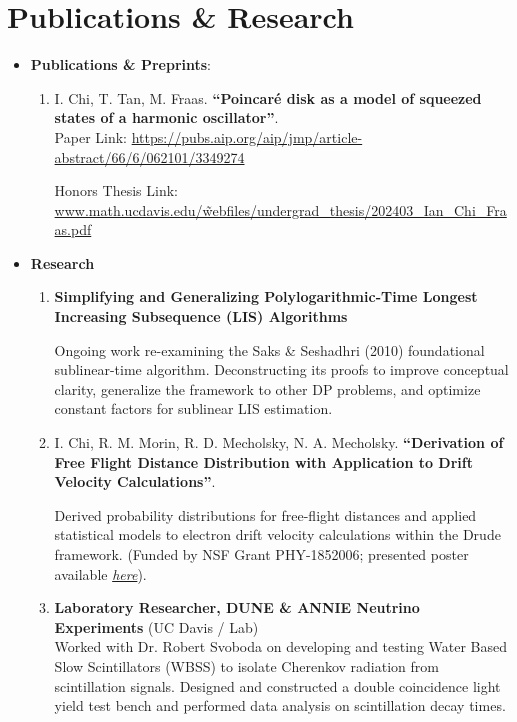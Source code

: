 \documentclass{curriculum-vitae}
\begin{document}
\section{Publications \& Research}
\begin{itemize}
    \item\textbf{Publications \& Preprints}:
    \begin{enumerate}
        \item\label{pub: pub1} I. Chi, T. Tan, M. Fraas. \textbf{``Poincar\'e disk as a model of squeezed states of a harmonic oscillator''}. \\
        Paper Link: \hyperlink{https://pubs.aip.org/aip/jmp/article-abstract/66/6/062101/3349274}{https://pubs.aip.org/aip/jmp/article-abstract/66/6/062101/3349274}

        Honors Thesis Link: \hyperlink{https://tinyurl.com/2pj46txh}{www.math.ucdavis.edu/\~webfiles/undergrad\_thesis/202403\_Ian\_Chi\_Fraas.pdf}

       

    \end{enumerate}
    \item \textbf{Research}
    \begin{enumerate}
        \item \textbf{Simplifying and Generalizing Polylogarithmic-Time Longest Increasing Subsequence (LIS) Algorithms}
        
        Ongoing work re-examining the Saks \& Seshadhri (2010) foundational sublinear-time algorithm. Deconstructing its proofs to improve conceptual clarity, generalize the framework to other DP problems, and optimize constant factors for sublinear LIS estimation.
        \item \label{pub: pub2} I. Chi, R. M. Morin, R. D. Mecholsky, N. A. Mecholsky. \textbf{``Derivation of Free Flight Distance Distribution with Application to Drift Velocity Calculations''}.
         
        Derived probability distributions for free-flight distances and applied statistical models to electron drift velocity calculations within the Drude framework.
        (Funded by NSF Grant PHY-1852006; presented poster available \href{https://drive.google.com/file/d/1rUFjoE8ORksClzMPz6evIloqEMJk0EOd/view}{\emph{here}}).
    \item \textbf{Laboratory Researcher, DUNE \& ANNIE Neutrino Experiments} (UC Davis / Lab) \\
    Worked with Dr. Robert Svoboda on developing and testing Water Based Slow Scintillators (WBSS) to isolate Cherenkov radiation from scintillation signals. Designed and constructed a double coincidence light yield test bench and performed data analysis on scintillation decay times.
    \end{enumerate}
    
\end{itemize}
\end{document}
